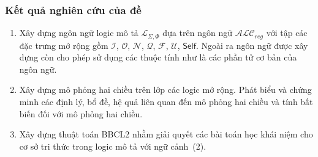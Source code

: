\documentclass[notheorems,xcolor=dvipsnames]{beamer}
\newcommand{\mL}		{\mathcal{L}}
\newcommand{\mI}		{\mathcal{I}}
\newcommand{\mO}		{\mathcal{O}}
\newcommand{\mN}		{\mathcal{N}}
\newcommand{\mQ}		{\mathcal{Q}}
\newcommand{\mF}		{\mathcal{F}}
\newcommand{\mU}		{\mathcal{U}}
\newcommand{\Self}		{\mathsf{Self}}
\newcommand{\mLSP}		{\mL_{\Sigma,\Phi}}
\newcommand{\ALCreg}	{$\mathcal{ALC}_{reg}$\xspace}
\newcommand{\BBCLearnS}		{BBCL2\xspace}
\begin{document}

\begin{frame}\frametitle{\bf Kết quả nghiên cứu của đề}
	\vspace{-1.0ex}
	\begin{enumerate}
		\setlength{\itemsep}{2.0ex}
		\item Xây dựng ngôn ngữ logic mô tả $\mLSP$ dựa trên ngôn ngữ \ALCreg với tập các đặc trưng mở rộng gồm $\mI$, $\mO$, $\mN$, $\mQ$, $\mF$, $\mU$, $\Self$. Ngoài ra ngôn ngữ được xây dựng còn cho phép sử dụng các thuộc tính như là các phần tử cơ bản của ngôn ngữ.
		
		\item Xây dựng mô phỏng hai chiều trên lớp các logic mở rộng. Phát biểu và chứng minh các định lý, bổ đề, hệ quả liên quan đến mô phỏng hai chiều và tính bất biến đối với mô phỏng hai chiều.
		
		\item Xây dựng thuật toán \BBCLearnS nhằm giải quyết các bài toán học khái niệm cho cơ sở tri thức trong logic mô tả với ngữ cảnh~(2).
	\end{enumerate}
\end{frame}
\end{document}
